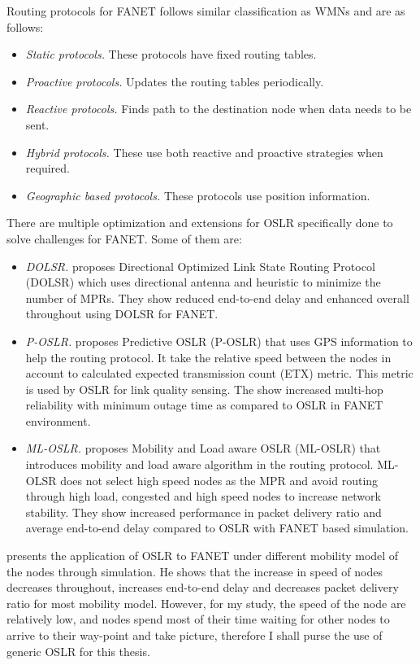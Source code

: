Routing protocols for FANET follows similar classification as WMNs and are as follows:

\begin{itemize} 
	\item \textit{Static protocols.} These protocols have fixed routing tables.
	\item \textit{Proactive protocols.} Updates the routing tables periodically.
	\item \textit{Reactive protocols.} Finds path to the destination node when data needs to be sent.
	\item \textit{Hybrid protocols.}  These use both reactive and proactive strategies when required. 
	\item \textit{Geographic based protocols.} These protocols use position information.
\end{itemize}

There are multiple optimization and extensions for OSLR specifically done to solve challenges for FANET. Some of them are:

\begin{itemize}
	\item \textit{DOLSR.}  proposes Directional Optimized Link State Routing Protocol (DOLSR) which uses directional antenna and heuristic to minimize the number of MPRs. They show reduced end-to-end delay and enhanced overall throughout using DOLSR for FANET.
	\item \textit{P-OSLR.}  proposes Predictive OSLR (P-OSLR) that uses GPS information to help the routing protocol. It take the relative speed between the nodes in account to calculated expected transmission count (ETX) metric. This metric is used by OSLR for link quality sensing. The show increased multi-hop reliability with minimum outage time as compared to OSLR in FANET environment.
	\item \textit{ML-OSLR.}  proposes Mobility and Load aware OSLR (ML-OSLR) that introduces mobility and load aware algorithm in the routing protocol. ML-OLSR does not select high speed nodes as the MPR and avoid routing through high load, congested and high speed nodes to increase network stability. They show increased performance in packet delivery ratio and average end-to-end delay compared to OSLR with FANET based simulation.
\end{itemize}

 presents the application of OSLR to FANET under different mobility model of the nodes through simulation. He shows that the increase in speed of nodes decreases throughout, increases end-to-end delay and decreases packet delivery ratio for most mobility model. However, for my study, the speed of the node are relatively low, and nodes spend most of their time waiting for other nodes to arrive to their way-point and take picture, therefore I shall purse the use of generic OSLR for this thesis.



